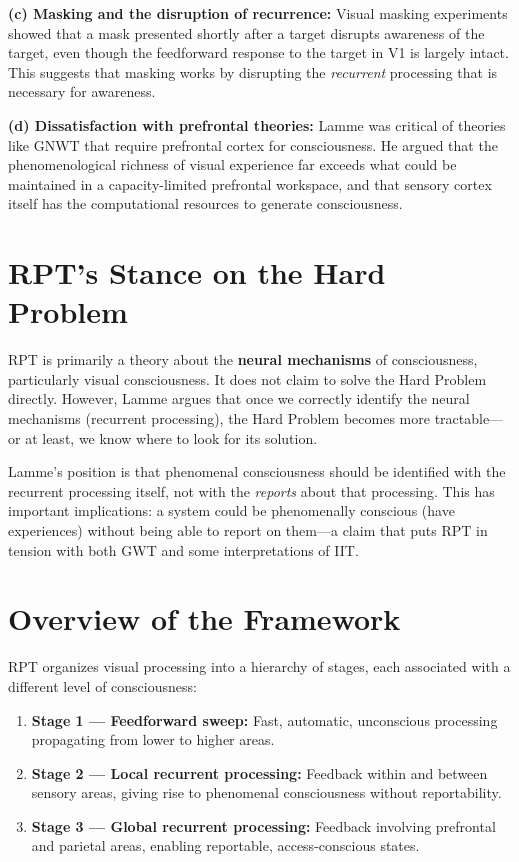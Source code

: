 \documentclass[11pt,a4paper]{report}
\begin{document}
\textbf{(c) Masking and the disruption of recurrence:} Visual masking experiments showed that a mask presented shortly after a target disrupts awareness of the target, even though the feedforward response to the target in V1 is largely intact. This suggests that masking works by disrupting the \emph{recurrent} processing that is necessary for awareness.

\textbf{(d) Dissatisfaction with prefrontal theories:} Lamme was critical of theories like GNWT that require prefrontal cortex for consciousness. He argued that the phenomenological richness of visual experience far exceeds what could be maintained in a capacity-limited prefrontal workspace, and that sensory cortex itself has the computational resources to generate consciousness.

\section{RPT's Stance on the Hard Problem}

RPT is primarily a theory about the \textbf{neural mechanisms} of consciousness, particularly visual consciousness. It does not claim to solve the Hard Problem directly. However, Lamme argues that once we correctly identify the neural mechanisms (recurrent processing), the Hard Problem becomes more tractable---or at least, we know where to look for its solution.

Lamme's position is that phenomenal consciousness should be identified with the recurrent processing itself, not with the \emph{reports} about that processing. This has important implications: a system could be phenomenally conscious (have experiences) without being able to report on them---a claim that puts RPT in tension with both GWT and some interpretations of IIT.

\section{Overview of the Framework}

RPT organizes visual processing into a hierarchy of stages, each associated with a different level of consciousness:

\begin{enumerate}[leftmargin=2em]
  \item \textbf{Stage 1 --- Feedforward sweep:} Fast, automatic, unconscious processing propagating from lower to higher areas.
  \item \textbf{Stage 2 --- Local recurrent processing:} Feedback within and between sensory areas, giving rise to phenomenal consciousness without reportability.
  \item \textbf{Stage 3 --- Global recurrent processing:} Feedback involving prefrontal and parietal areas, enabling reportable, access-conscious states.
\end{enumerate}
\end{document}
